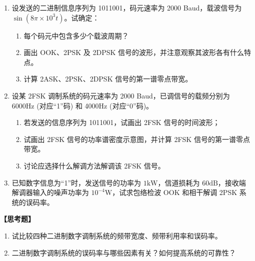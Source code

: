 \documentclass[a4paper,11pt]{ctexart}
\begin{document}
\begin{enumerate}[label=\textbf{7-\arabic*}]
    \item 设发送的二进制信息序列为 1011001，码元速率为 2000 Baud，载波信号为 $\sin(8\pi \times 10^3 t)$。试确定：
    \begin{enumerate}
        \item 每个码元中包含多少个载波周期？
        \item 画出 OOK、2PSK 及 2DPSK 信号的波形，并注意观察其波形各有什么特点。
        \item 计算 2ASK、2PSK、2DPSK 信号的第一谱零点带宽。
    \end{enumerate}
    \vspace{4em}
    
    \item 设某 2FSK 调制系统的码元速率为 2000 Baud，已调信号的载频分别为 6000Hz (对应“1”码) 和 4000Hz (对应“0”码)。
    \begin{enumerate}
        \item 若发送的信息序列为 1011001，试画出 2FSK 信号的时间波形；
        \item 试画出 2FSK 信号的功率谱密度示意图，并计算 2FSK 信号的第一谱零点带宽。
        \item 讨论应选择什么解调方法解调该 2FSK 信号。
    \end{enumerate}
    \vspace{4em}
    
    \setcounter{enumi}{11} %
    \item 已知数字信息为“1”时，发送信号的功率为 $1\text{kW}$，信道损耗为 $60\text{dB}$，接收端解调器输入的噪声功率为 $10^{-4}\text{W}$，试求包络检波 OOK 和相干解调 2PSK 系统的误码率。
    \vspace{4em}
    
\end{enumerate}

\noindent\textbf{【思考题】}
\begin{enumerate}
    \item 试比较四种二进制数字调制系统的频带宽度、频带利用率和误码率。
    \item 二进制数字调制系统的误码率与哪些因素有关？如何提高系统的可靠性？
\end{enumerate}
\end{document}
